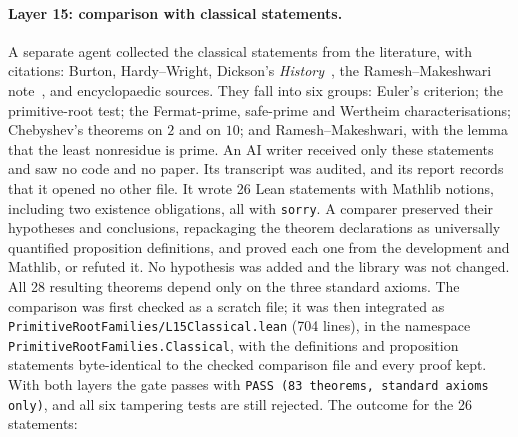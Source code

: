 \documentclass[11pt]{article}
\theoremstyle{remark}
\newcommand{\lean}[1]{\texttt{#1}}
\begin{document}
\paragraph{Layer 15: comparison with classical statements.}
A separate agent collected the classical statements from the literature, with citations: Burton,
Hardy--Wright, Dickson's \emph{History}~\cite{Dickson}, the Ramesh--Makeshwari note~\cite{RM}, and
encyclopaedic sources. They fall into six groups: Euler's criterion; the primitive-root test; the
Fermat-prime, safe-prime and Wertheim characterisations; Chebyshev's theorems on $2$ and on $10$;
and Ramesh--Makeshwari, with the lemma that the least nonresidue is prime. An AI writer received only
these statements and saw no code and no paper. Its transcript was audited, and its
report records that it opened no other file. It
wrote 26 Lean statements with Mathlib notions, including two existence obligations, all
with \lean{sorry}. A comparer preserved their hypotheses and conclusions, repackaging the theorem declarations as universally quantified proposition definitions, and proved each one from the development and
Mathlib, or refuted it. No hypothesis was added and the library was not changed. All 28 resulting
theorems depend only on the three standard axioms. The comparison was first checked as a scratch
file; it was then integrated as \lean{PrimitiveRootFamilies/L15Classical.lean} (704 lines), in the
namespace \lean{PrimitiveRootFamilies.Classical}, with the definitions and proposition statements
byte-identical to the checked comparison file and every proof kept. With both layers the gate passes with
\texttt{PASS (83 theorems, standard axioms only)}, and all six tampering tests are still rejected.
The outcome for the 26 statements:
\end{document}
